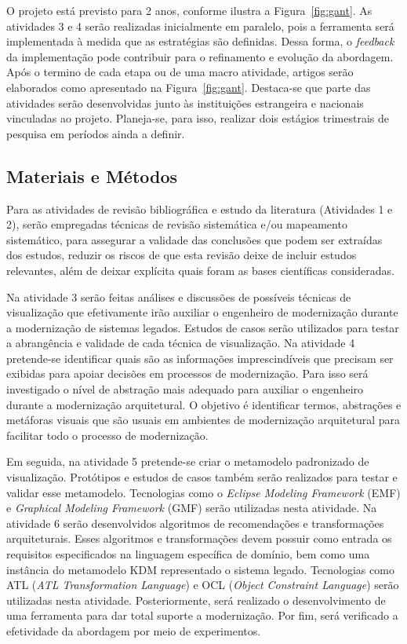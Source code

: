 \documentclass[12pt]{article}
\begin{document}
O projeto está previsto para 2 anos, conforme ilustra a Figura~\ref{fig:gant}. As atividades 3 e 4 serão realizadas inicialmente em paralelo, pois a ferramenta será implementada à medida que as estratégias são definidas. Dessa forma, o \textit{feedback} da implementação pode contribuir para o refinamento e evolução da abordagem. Após o termino de cada etapa ou de uma macro atividade, artigos serão elaborados como apresentado na Figura~\ref{fig:gant}. 
Destaca-se que parte das atividades serão desenvolvidas junto às instituições estrangeira e nacionais vinculadas ao projeto. Planeja-se, para isso, realizar dois estágios trimestrais de pesquisa em períodos ainda a definir. 

\subsection{Materiais e Métodos}

Para as atividades de revisão bibliográfica e estudo da literatura (Atividades 1 e 2), serão empregadas técnicas de revisão sistemática e/ou mapeamento sistemático, para assegurar a validade das conclusões que podem ser extraídas dos estudos, reduzir os riscos de que esta revisão deixe de incluir estudos relevantes, além de deixar explícita quais foram as bases científicas consideradas.

Na atividade 3 serão feitas análises e discussões de possíveis técnicas de visualização que efetivamente irão auxiliar o engenheiro de modernização durante a modernização de sistemas legados. Estudos de casos serão utilizados para testar a abrangência e validade de cada técnica de visualização. Na atividade 4 pretende-se identificar quais são as informações imprescindíveis que precisam ser exibidas para apoiar decisões em processos de modernização. Para isso será investigado o nível de abstração mais adequado para auxiliar o engenheiro durante a modernização arquitetural. O objetivo é identificar termos, abstrações e metáforas visuais que são usuais em ambientes de modernização arquitetural para facilitar todo o processo de modernização.

Em seguida, na atividade 5 pretende-se criar o metamodelo padronizado de visualização. Protótipos e estudos de casos também serão realizados para testar e validar esse metamodelo. Tecnologias como o \textit{Eclipse Modeling Framework} (EMF) e \textit{Graphical Modeling Framework} (GMF) serão utilizadas nesta atividade. Na atividade 6 serão desenvolvidos algoritmos de recomendações e transformações arquiteturais. Esses algoritmos e transformações devem possuir como entrada os requisitos especificados na linguagem específica de domínio, bem como uma instância do metamodelo KDM representado o sistema legado. Tecnologias como ATL (\textit{ATL Transformation Language}) e OCL (\textit{Object Constraint Language}) serão utilizadas nesta atividade. Posteriormente, será realizado o desenvolvimento de uma ferramenta para dar total suporte a modernização. Por fim, será verificado a efetividade da abordagem por meio de experimentos. 
\end{document}
